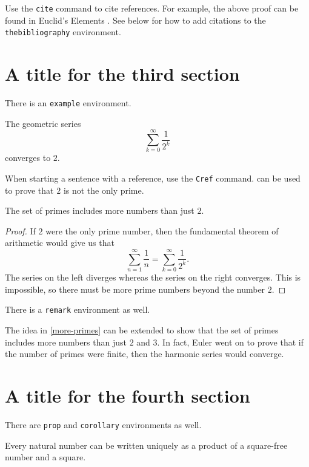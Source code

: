 \documentclass{rhumj_new}
\begin{document}
Use the \texttt{cite} command to cite references. For example, the above proof can be found in Euclid's Elements \cite{elements}. See below for how to add citations to the \texttt{thebibliography} environment.

\section{A title for the third section}

There is an \texttt{example} environment.

\begin{exa} \label{geo-series} The geometric series
\[ \sum_{k=0}^{\infty} \frac{1}{2^k} \]
converges to $2$.
\end{exa}

When starting a sentence with a reference, use the \texttt{Cref} command.  can be used to prove that $2$ is not the only prime.

\begin{thm} \label{more-primes} The set of primes includes more numbers than just $2$.
\end{thm}

\begin{proof}
If $2$ were the only prime number, then the fundamental theorem of arithmetic would give us that
\[ \sum_{n=1}^{\infty} \frac{1}{n} = \sum_{k=0}^{\infty} \frac{1}{2^k}.\]
The series on the left diverges whereas the series on the right converges. This is impossible, so there must be more prime numbers beyond the number $2$.
\end{proof}

There is a \texttt{remark} environment as well.

\begin{remark} The idea in \cref{more-primes} can be extended to show that the set of primes includes more numbers than just $2$ and $3$. In fact, Euler went on to prove that if the number of primes were finite, then the harmonic series would converge.
\end{remark}

\section{A title for the fourth section}

There are \texttt{prop} and \texttt{corollary} environments as well.

\begin{prop} \label{sqr-decomp} Every natural number can be written uniquely as a product of a square-free number and a square.
\end{prop}
\end{document}
